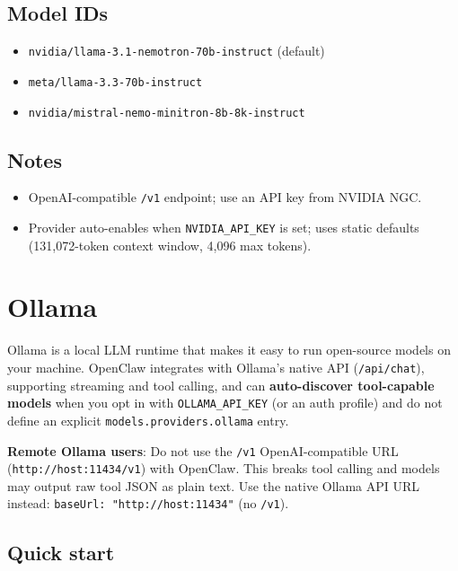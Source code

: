 \subsection{Model IDs}


\begin{itemize}
  \item \texttt{nvidia/llama-3.1-nemotron-70b-instruct} (default)
  \item \texttt{meta/llama-3.3-70b-instruct}
  \item \texttt{nvidia/mistral-nemo-minitron-8b-8k-instruct}
\end{itemize}


\subsection{Notes}


\begin{itemize}
  \item OpenAI-compatible \texttt{/v1} endpoint; use an API key from NVIDIA NGC.
  \item Provider auto-enables when \texttt{NVIDIA\_API\_KEY} is set; uses static defaults (131,072-token context window, 4,096 max tokens).
\end{itemize}



\clearpage

\section{Ollama}


Ollama is a local LLM runtime that makes it easy to run open-source models on your machine. OpenClaw integrates with Ollama's native API (\texttt{/api/chat}), supporting streaming and tool calling, and can \textbf{auto-discover tool-capable models} when you opt in with \texttt{OLLAMA\_API\_KEY} (or an auth profile) and do not define an explicit \texttt{models.providers.ollama} entry.

\textbf{Remote Ollama users}: Do not use the \texttt{/v1} OpenAI-compatible URL (\texttt{http://host:11434/v1}) with OpenClaw. This breaks tool calling and models may output raw tool JSON as plain text. Use the native Ollama API URL instead: \texttt{baseUrl: "http://host:11434"} (no \texttt{/v1}).

\subsection{Quick start}


